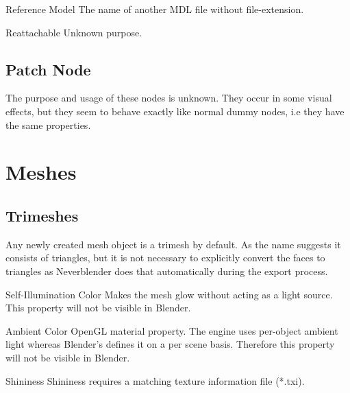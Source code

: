 \begin{propertyAurora}{Reference Model}
The name of another MDL file without file-extension.
\end{propertyAurora}

\begin{propertyAurora}{Reattachable}
Unknown purpose.
\end{propertyAurora}

\subsection{Patch Node}
The purpose and usage of these nodes is unknown. They occur in some visual effects, but
they seem to behave exactly like normal dummy nodes, i.e they have the same
properties.

\section{Meshes}

\subsection{Trimeshes}

Any newly created mesh object is a trimesh by default. As the name 
suggests it consists of triangles, but it is not necessary to explicitly 
convert the faces to triangles as Neverblender does that automatically 
during the export process.


\begin{propertyAurora}{Self-Illumination Color}
Makes the mesh glow without acting as a light source.
This property will not be visible in Blender.
\end{propertyAurora}

\begin{propertyAurora}{Ambient Color}
OpenGL material property. The engine uses per-object ambient light whereas Blender's 
defines it on a per scene basis. Therefore this property will not be visible in Blender.
\end{propertyAurora}

\begin{propertyAurora}{Shininess}
Shininess requires a matching texture information file (*.txi).
\end{propertyAurora}

